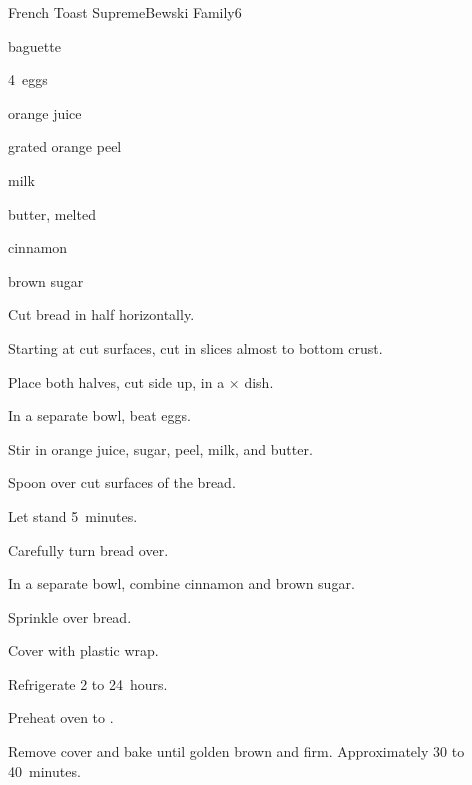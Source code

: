 \begin{recipe}{French Toast Supreme}{Bewski Family}{6}

\begin{ingredients}
\item baguette
\item 4~eggs
\item \C{\third} orange juice
\item \tp{\half} grated orange peel
\item \C{1\quarter} milk
\item {} butter, melted
\item \tp{\eighth} cinnamon
\item {} brown sugar
\end{ingredients}

\begin{directions}
\item Cut bread in half horizontally.
\item Starting at cut surfaces, cut in  slices almost to bottom crust.
\item Place both halves, cut side up, in a $\times$ dish.
\item In a separate bowl, beat eggs.
\item Stir in orange juice, sugar, peel, milk, and butter.
\item Spoon over cut surfaces of the bread.
\item Let stand 5~minutes.
\item Carefully turn bread over.
\item In a separate bowl, combine cinnamon and brown sugar.
\item Sprinkle over bread.
\item Cover with plastic wrap.
\item Refrigerate 2 to 24~hours.
\item Preheat oven to .
\item Remove cover and bake until golden brown and firm. Approximately 30 to 40~minutes.
\end{directions}

\end{recipe}
